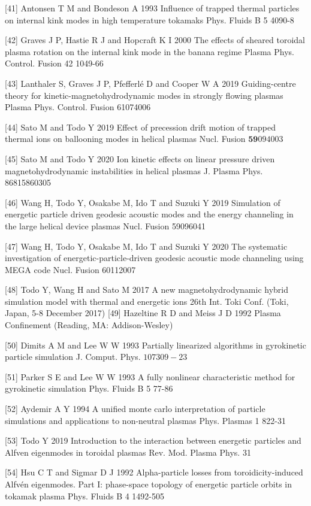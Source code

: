 \documentclass[10pt]{article}
\begin{document}
[41] Antonsen T M and Bondeson A 1993 Influence of trapped thermal particles on internal kink modes in high temperature tokamaks Phys. Fluids B 5 4090-8

[42] Graves J P, Hastie R J and Hopcraft K I 2000 The effects of sheared toroidal plasma rotation on the internal kink mode in the banana regime Plasma Phys. Control. Fusion 42 1049-66

[43] Lanthaler S, Graves J P, Pfefferlé D and Cooper W A 2019 Guiding-centre theory for kinetic-magnetohydrodynamic modes in strongly flowing plasmas Plasma Phys. Control. Fusion 61074006

[44] Sato M and Todo Y 2019 Effect of precession drift motion of trapped thermal ions on ballooning modes in helical plasmas Nucl. Fusion $\mathbf{5 9} 094003$

[45] Sato M and Todo Y 2020 Ion kinetic effects on linear pressure driven magnetohydrodynamic instabilities in helical plasmas J. Plasma Phys. 86815860305

[46] Wang H, Todo Y, Osakabe M, Ido T and Suzuki Y 2019 Simulation of energetic particle driven geodesic acoustic modes and the energy channeling in the large helical device plasmas Nucl. Fusion 59096041

[47] Wang H, Todo Y, Osakabe M, Ido T and Suzuki Y 2020 The systematic investigation of energetic-particle-driven geodesic acoustic mode channeling using MEGA code Nucl. Fusion 60112007

[48] Todo Y, Wang H and Sato M 2017 A new magnetohydrodynamic hybrid simulation model with thermal and energetic ions 26th Int. Toki Conf. (Toki, Japan, 5-8 December 2017) [49] Hazeltine R D and Meiss J D 1992 Plasma Confinement (Reading, MA: Addison-Wesley)

[50] Dimits A M and Lee W W 1993 Partially linearized algorithms in gyrokinetic particle simulation J. Comput. Phys. $107309-23$

[51] Parker S E and Lee W W 1993 A fully nonlinear characteristic method for gyrokinetic simulation Phys. Fluids B 5 77-86

[52] Aydemir A Y 1994 A unified monte carlo interpretation of particle simulations and applications to non-neutral plasmas Phys. Plasmas 1 822-31

[53] Todo Y 2019 Introduction to the interaction between energetic particles and Alfven eigenmodes in toroidal plasmas Rev. Mod. Plasma Phys. 31

[54] Hsu C T and Sigmar D J 1992 Alpha-particle losses from toroidicity-induced Alfvén eigenmodes. Part I: phase-space topology of energetic particle orbits in tokamak plasma Phys. Fluids B 4 1492-505
\end{document}

